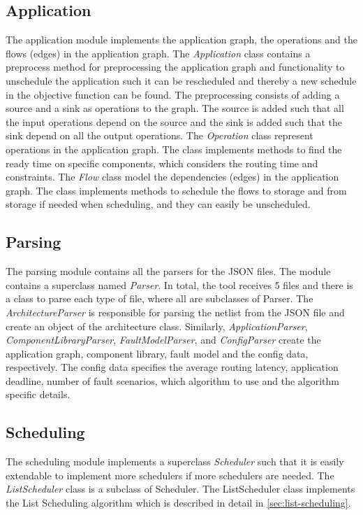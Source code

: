 \subsection{Application}
The application module implements the application graph, the operations and the flows (edges) in the application graph. The \emph{Application} class contains a preprocess method for preprocessing the application graph and functionality to unschedule the application such it can be rescheduled and thereby a new schedule in the objective function can be found. The preprocessing consists of adding a source and a sink as operations to the graph. The source is added such that all the input operations depend on the source and the sink is added such that the sink depend on all the output operations. The \emph{Operation} class represent operations in the application graph. The class implements methods to find the ready time on specific components, which considers the routing time and constraints. The \emph{Flow} class model the dependencies (edges) in the application graph. The class implements methods to schedule the flows to storage and from storage if needed when scheduling, and they can easily be unscheduled.

\subsection{Parsing}
The parsing module contains all the parsers for the JSON files. The module contains a superclass named \emph{Parser}. In total, the tool receives 5 files and there is a class to parse each type of file, where all are subclasses of Parser. The \emph{ArchitectureParser} is responsible for parsing the netlist from the JSON file and create an object of the architecture class. Similarly, \emph{ApplicationParser}, \emph{ComponentLibraryParser}, \emph{FaultModelParser}, and \emph{ConfigParser} create the application graph, component library, fault model and the config data, respectively. The config data specifies the average routing latency, application deadline, number of fault scenarios, which algorithm to use and the algorithm specific details.

\subsection{Scheduling}
The scheduling module implements a superclass \emph{Scheduler} such that it is easily extendable to implement more schedulers if more schedulers are needed. The \emph{ListScheduler} class is a subclass of Scheduler. The ListScheduler class implements the List Scheduling algorithm which is described in detail in \autoref{sec:list-scheduling}.

